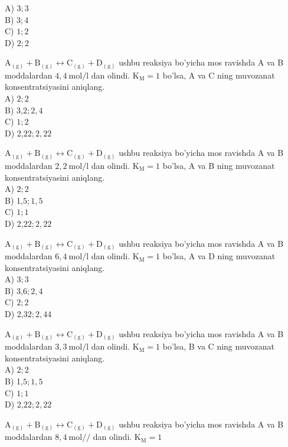 A) $3 ; 3$\\
B) $3 ; 4$\\
C) $1 ; 2$\\
D) $2 ; 2$
  \item $\mathrm{A}_{(\mathrm{g})}+\mathrm{B}_{(\mathrm{g})} \leftrightarrow \mathrm{C}_{(\mathrm{g})}+\mathrm{D}_{(\mathrm{g})}$ ushbu reaksiya bo'yicha mos ravishda A va B moddalardan $4,4 \mathrm{~mol} / \mathrm{l}$ dan olindi. $\mathrm{K}_{\mathrm{M}}=1$ bo'lsa, A va C ning muvozanat konsentratsiyasini aniqlang.\\
A) $2 ; 2$\\
B) 3,$2 ; 2,4$\\
C) $1 ; 2$\\
D) 2,$22 ; 2,22$
  \item $\mathrm{A}_{(\mathrm{g})}+\mathrm{B}_{(\mathrm{g})} \leftrightarrow \mathrm{C}_{(\mathrm{g})}+\mathrm{D}_{(\mathrm{g})}$ ushbu reaksiya bo'yicha mos ravishda A va B moddalardan $2,2 \mathrm{~mol} / \mathrm{l}$ dan olindi. $\mathrm{K}_{\mathrm{M}}=1$ bo'lsa, A va B ning muvozanat konsentratsiyasini aniqlang.\\
A) $2 ; 2$\\
B) 1,$5 ; 1,5$\\
C) $1 ; 1$\\
D) 2,$22 ; 2,22$
  \item $\mathrm{A}_{(\mathrm{g})}+\mathrm{B}_{(\mathrm{g})} \leftrightarrow \mathrm{C}_{(\mathrm{g})}+\mathrm{D}_{(\mathrm{g})}$ ushbu reaksiya bo'yicha mos ravishda A va B moddalardan $6,4 \mathrm{~mol} / \mathrm{l}$ dan olindi. $\mathrm{K}_{\mathrm{M}}=1$ bo'lsa, A va D ning muvozanat konsentratsiyasini aniqlang.\\
A) $3 ; 3$\\
B) 3,$6 ; 2,4$\\
C) $2 ; 2$\\
D) 2,$32 ; 2,44$
  \item $\mathrm{A}_{(\mathrm{g})}+\mathrm{B}_{(\mathrm{g})} \leftrightarrow \mathrm{C}_{(\mathrm{g})}+\mathrm{D}_{(\mathrm{g})}$ ushbu reaksiya bo'yicha mos ravishda A va B moddalardan $3,3 \mathrm{~mol} / \mathrm{l}$ dan olindi. $\mathrm{K}_{\mathrm{M}}=1$ bo'lsa, B va C ning muvozanat konsentratsiyasini aniqlang.\\
A) $2 ; 2$\\
B) 1,$5 ; 1,5$\\
C) $1 ; 1$\\
D) 2,$22 ; 2,22$
  \item $\mathrm{A}_{(\mathrm{g})}+\mathrm{B}_{(\mathrm{g})} \leftrightarrow \mathrm{C}_{(\mathrm{g})}+\mathrm{D}_{(\mathrm{g})}$ ushbu reaksiya bo'yicha mos ravishda A va B moddalardan $8,4 \mathrm{~mol} / /$ dan olindi. $\mathrm{K}_{\mathrm{M}}=1$\\
